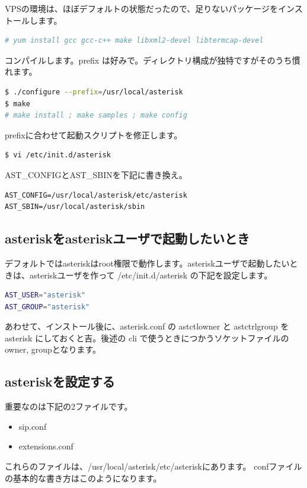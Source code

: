 VPSの環境は、ほぼデフォルトの状態だったので、足りないパッケージをインストールします。

\begin{lstlisting}[language=bash]
# yum install gcc gcc-c++ make libxml2-devel libtermcap-devel
\end{lstlisting}

コンパイルします。prefix は好みで。ディレクトリ構成が独特ですがそのうち慣れます。

\begin{lstlisting}[language=bash]
$ ./configure --prefix=/usr/local/asterisk
$ make
# make install ; make samples ; make config
\end{lstlisting}

prefixに合わせて起動スクリプトを修正します。

\begin{lstlisting}[language=bash]
$ vi /etc/init.d/asterisk
\end{lstlisting}

AST\_CONFIGとAST\_SBINを下記に書き換え。
\begin{lstlisting}
AST_CONFIG=/usr/local/asterisk/etc/asterisk
AST_SBIN=/usr/local/asterisk/sbin
\end{lstlisting}

\subsection{asteriskをasteriskユーザで起動したいとき}
デフォルトではasteriskはroot権限で動作します。asteriskユーザで起動したいときは、asteriskユーザを作って /etc/init.d/asterisk の下記を設定します。

\begin{lstlisting}[language=bash]
AST_USER="asterisk"
AST_GROUP="asterisk"
\end{lstlisting}

あわせて、インストール後に、asterisk.conf の astctlowner と astctrlgroup を asterisk にしておくと吉。後述の cli で使うときにつかうソケットファイルのowner, groupとなります。

\subsection{asteriskを設定する}
重要なのは下記の2ファイルです。
\begin{itemize}
\item sip.conf
\item extensions.conf
\end{itemize}
これらのファイルは、/usr/local/asterisk/etc/asteriskにあります。
confファイルの基本的な書き方はこのようになります。

